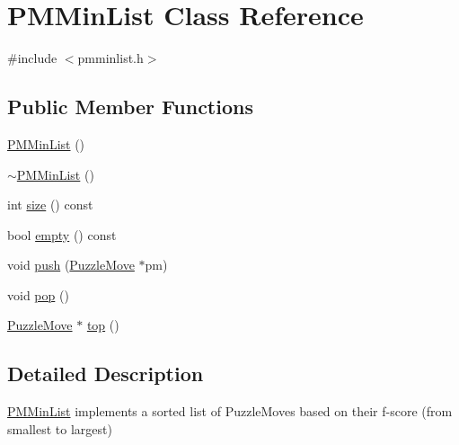 \hypertarget{classPMMinList}{\section{\-P\-M\-Min\-List \-Class \-Reference}
\label{classPMMinList}
}


{\ttfamily \#include $<$pmminlist.\-h$>$}

\subsection*{\-Public \-Member \-Functions}
\begin{DoxyCompactItemize}
\item 
\hyperlink{classPMMinList_a1fa1ed01cc65ea09cdd9bd10198fabee}{\-P\-M\-Min\-List} ()
\item 
\hyperlink{classPMMinList_a886c0f8fe079a8353c23da4ff163beae}{$\sim$\-P\-M\-Min\-List} ()
\item 
int \hyperlink{classPMMinList_a692220d438ffab3cf6729de3dc38c1fb}{size} () const 
\item 
bool \hyperlink{classPMMinList_a1c148a978af1a6ea964ee7141a80855e}{empty} () const 
\item 
void \hyperlink{classPMMinList_aafa81672d5dd017bf5e6f76b65022d21}{push} (\hyperlink{classPuzzleMove}{\-Puzzle\-Move} $\ast$pm)
\item 
void \hyperlink{classPMMinList_a77fa8f64f75cc6c1469688928d372089}{pop} ()
\item 
\hyperlink{classPuzzleMove}{\-Puzzle\-Move} $\ast$ \hyperlink{classPMMinList_a6a04fe787c09097ecd3a76428a3524ba}{top} ()
\end{DoxyCompactItemize}


\subsection{\-Detailed \-Description}
\hyperlink{classPMMinList}{\-P\-M\-Min\-List} implements a sorted list of \-Puzzle\-Moves based on their f-\/score (from smallest to largest) 

